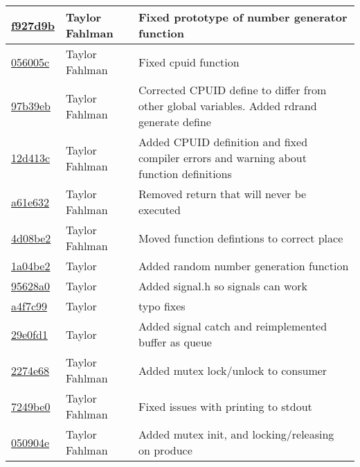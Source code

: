 \begin{tabular}{l l l}
\href{https://github.com/fahlmant/cs444/commit/f927d9b39907620e959c235c9b56ab0160bbc366}{f927d9b} & Taylor Fahlman & Fixed prototype of number generator function\\\hline
\href{https://github.com/fahlmant/cs444/commit/056005ccb725e1ce91c211bb5cc71acdd3cfe5e4}{056005c} & Taylor Fahlman & Fixed cpuid function\\\hline
\href{https://github.com/fahlmant/cs444/commit/97b39ebde5ea4090c9371d7868ec9984c6230703}{97b39eb} & Taylor Fahlman & Corrected CPUID define to differ from other global variables. Added rdrand generate define\\\hline
\href{https://github.com/fahlmant/cs444/commit/12d413cdbc773bea9797fbc8ffc523df368cae5c}{12d413c} & Taylor Fahlman & Added CPUID definition and fixed compiler errors and warning about function definitions\\\hline
\href{https://github.com/fahlmant/cs444/commit/a61e6320173be1ea668966396bb45bc7930d34f9}{a61e632} & Taylor Fahlman & Removed return that will never be executed\\\hline
\href{https://github.com/fahlmant/cs444/commit/4d08be28f8900f197846be9ac81d7c0d4c45cc03}{4d08be2} & Taylor Fahlman & Moved function defintions to correct place\\\hline
\href{https://github.com/fahlmant/cs444/commit/1a04be2d025bdf2f264d2fdcd2dad95ded4fb324}{1a04be2} & Taylor & Added random number generation function\\\hline
\href{https://github.com/fahlmant/cs444/commit/95628a0549663a27c0a3ef1f04118db28e89acda}{95628a0} & Taylor & Added signal.h so signals can work\\\hline
\href{https://github.com/fahlmant/cs444/commit/a4f7c992ec397d9b510126246137537b77e55930}{a4f7c99} & Taylor & typo fixes\\\hline
\href{https://github.com/fahlmant/cs444/commit/29e0fd1c29a38fec3bd5a999d8bf8efa513c70fd}{29e0fd1} & Taylor & Added signal catch and reimplemented buffer as queue\\\hline
\href{https://github.com/fahlmant/cs444/commit/2274e684608cf836dc48bda6d3ec5d5d9b66f5fb}{2274e68} & Taylor Fahlman & Added mutex lock/unlock to consumer\\\hline
\href{https://github.com/fahlmant/cs444/commit/7249be01ba7edbda6723b5acbe59f46efa2886a9}{7249be0} & Taylor Fahlman & Fixed issues with printing to stdout\\\hline
\href{https://github.com/fahlmant/cs444/commit/050904eeb0342d93e297fec347a08544cc99ce07}{050904e} & Taylor Fahlman & Added mutex init, and locking/releasing on produce\\\hline

\end{tabular}
